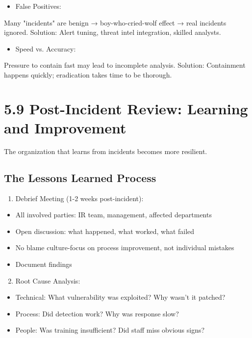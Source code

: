 \documentclass[10pt]{article}
\begin{document}
\begin{itemize}
  \item False Positives:
\end{itemize}

Many "incidents" are benign → boy-who-cried-wolf effect → real incidents ignored. Solution: Alert tuning, threat intel integration, skilled analysts.

\begin{itemize}
  \item Speed vs. Accuracy:
\end{itemize}

Pressure to contain fast may lead to incomplete analysis. Solution: Containment happens quickly; eradication takes time to be thorough.

\section*{5.9 Post-Incident Review: Learning and Improvement}
The organization that learns from incidents becomes more resilient.

\subsection*{The Lessons Learned Process}
\begin{enumerate}
  \item Debrief Meeting (1-2 weeks post-incident):
\end{enumerate}

\begin{itemize}
  \item All involved parties: IR team, management, affected departments
  \item Open discussion: what happened, what worked, what failed
  \item No blame culture-focus on process improvement, not individual mistakes
  \item Document findings
\end{itemize}

\begin{enumerate}
  \setcounter{enumi}{1}
  \item Root Cause Analysis:
\end{enumerate}

\begin{itemize}
  \item Technical: What vulnerability was exploited? Why wasn't it patched?
  \item Process: Did detection work? Why was response slow?
  \item People: Was training insufficient? Did staff miss obvious signs?
\end{itemize}
\end{document}
